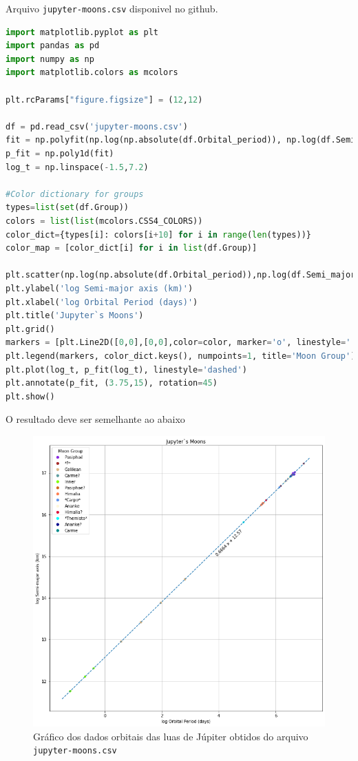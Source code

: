 Arquivo {\tt jupyter-moons.csv} disponivel no github.
\begin{lstlisting}[language=Python, frame=lines,basicstyle=\footnotesize, caption={Lus de Jupyter e A terceira Lei de Kepler}, label={lst:jup-k-3law}]
import matplotlib.pyplot as plt
import pandas as pd
import numpy as np
import matplotlib.colors as mcolors

plt.rcParams["figure.figsize"] = (12,12)

df = pd.read_csv('jupyter-moons.csv')
fit = np.polyfit(np.log(np.absolute(df.Orbital_period)), np.log(df.Semi_major_axis), 1)
p_fit = np.poly1d(fit)
log_t = np.linspace(-1.5,7.2)

#Color dictionary for groups
types=list(set(df.Group))
colors = list(list(mcolors.CSS4_COLORS))   
color_dict={types[i]: colors[i+10] for i in range(len(types))}
color_map = [color_dict[i] for i in list(df.Group)]

plt.scatter(np.log(np.absolute(df.Orbital_period)),np.log(df.Semi_major_axis),c = color_map, s=df.log_mass)
plt.ylabel('log Semi-major axis (km)')
plt.xlabel('log Orbital Period (days)')
plt.title('Jupyter`s Moons')
plt.grid()
markers = [plt.Line2D([0,0],[0,0],color=color, marker='o', linestyle='') for color in color_dict.values()]
plt.legend(markers, color_dict.keys(), numpoints=1, title='Moon Group')
plt.plot(log_t, p_fit(log_t), linestyle='dashed')
plt.annotate(p_fit, (3.75,15), rotation=45)
plt.show()
\end{lstlisting}

O resultado deve ser semelhante ao abaixo

\begin{figure}[h!]
\centering
\includegraphics[scale=0.5]{Images/jupyter-moons.png}
\caption{Gráfico dos dados orbitais das luas de Júpiter obtidos do arquivo {\tt jupyter-moons.csv}}\label{fig:Jupyter-moons}
\end{figure}

